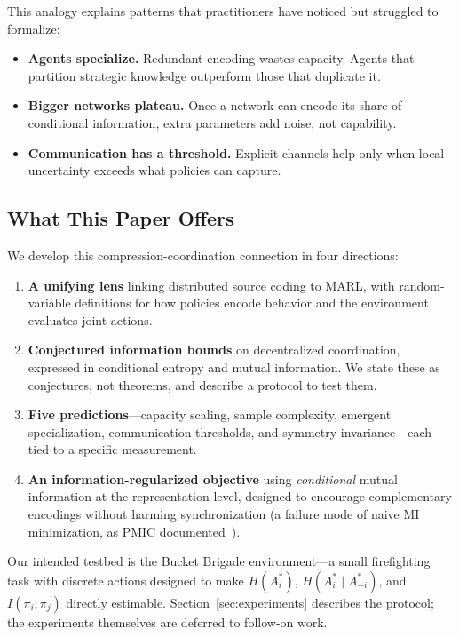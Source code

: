 \documentclass[10pt, letterpaper]{article}
\begin{document}
This analogy explains patterns that practitioners have noticed but struggled to formalize:
\begin{itemize}
    \item \textbf{Agents specialize.} Redundant encoding wastes capacity. Agents that partition strategic knowledge outperform those that duplicate it.
    \item \textbf{Bigger networks plateau.} Once a network can encode its share of conditional information, extra parameters add noise, not capability.
    \item \textbf{Communication has a threshold.} Explicit channels help only when local uncertainty exceeds what policies can capture.
\end{itemize}

\subsection*{What This Paper Offers}

We develop this compression-coordination connection in four directions:
\begin{enumerate}
    \item \textbf{A unifying lens} linking distributed source coding to MARL, with random-variable definitions for how policies encode behavior and the environment evaluates joint actions.
    \item \textbf{Conjectured information bounds} on decentralized coordination, expressed in conditional entropy and mutual information. We state these as conjectures, not theorems, and describe a protocol to test them.
    \item \textbf{Five predictions}---capacity scaling, sample complexity, emergent specialization, communication thresholds, and symmetry invariance---each tied to a specific measurement.
    \item \textbf{An information-regularized objective} using \emph{conditional} mutual information at the representation level, designed to encourage complementary encodings without harming synchronization (a failure mode of naive MI minimization, as PMIC documented~\cite{li2022pmic}).
\end{enumerate}

Our intended testbed is the Bucket Brigade environment---a small firefighting task with discrete actions designed to make $H(A_i^*)$, $H(A_i^* \mid A_{-i}^*)$, and $I(\pi_i; \pi_j)$ directly estimable. Section~\ref{sec:experiments} describes the protocol; the experiments themselves are deferred to follow-on work.
\end{document}
